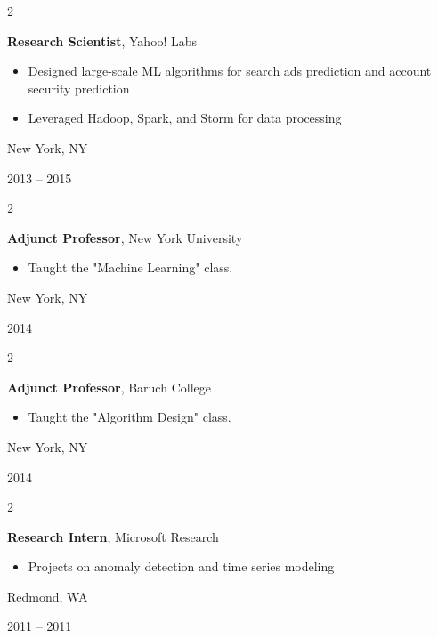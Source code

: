 \documentclass[10pt, letterpaper]{article}
\newenvironment{highlights}{
    \begin{itemize}[
        topsep=0.10 cm,
        parsep=0.10 cm,
        partopsep=0pt,
        itemsep=0pt,
        leftmargin=0.4 cm + 10pt
    ]
}{
    \end{itemize}
}
\newenvironment{twocolentry}[2][]{
    \onecolentry
    \def\secondColumn{#2}
    \setcolumnwidth{\fill, 4.5 cm}
    \begin{paracol}{2}
}{
    \switchcolumn \raggedleft \secondColumn
    \end{paracol}
    \endonecolentry
}
\begin{document}
    \vspace{0.12 cm}

    \begin{twocolentry}{
        New York, NY

        2013 -- 2015
    }
        \textbf{\color{primaryColor}Research Scientist}, Yahoo! Labs
        \begin{highlights}
            \item Designed large-scale ML algorithms for search ads prediction and account security prediction
            \item Leveraged Hadoop, Spark, and Storm for data processing
        \end{highlights}
    \end{twocolentry}

    \vspace{0.12 cm}

    \begin{twocolentry}{
        New York, NY

        2014
    }
        \textbf{\color{primaryColor}Adjunct Professor}, New York University
        \begin{highlights}
            \item Taught the "Machine Learning" class.
        \end{highlights}
    \end{twocolentry}

    \vspace{0.12 cm}

    \begin{twocolentry}{
        New York, NY

        2014
    }
        \textbf{\color{primaryColor}Adjunct Professor}, Baruch College
        \begin{highlights}
            \item Taught the "Algorithm Design" class.
        \end{highlights}
    \end{twocolentry}

    \vspace{0.12 cm}

    \begin{twocolentry}{
        Redmond, WA

        2011 -- 2011
    }
        \textbf{\color{primaryColor}Research Intern}, Microsoft Research
        \begin{highlights}
            \item Projects on anomaly detection and time series modeling
        \end{highlights}
    \end{twocolentry}
\end{document}
